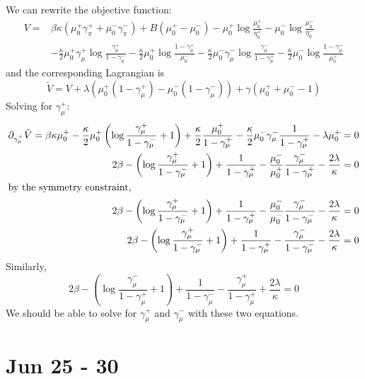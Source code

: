\documentclass[12pt]{article}
\numberwithin{equation}{section}
\begin{document}
\newpage
We can rewrite the objective function:
\begin{align*}
    V = & \beta \kappa\left(\mu_0^+\gamma_\pi^+ + \mu_0^-\gamma_\pi^-\right)
    + B\left(\mu_0^+ - \mu_0^-\right)
    - \mu_0^+\log\frac{\mu_0^+}{\eta_0^+} - \mu_0^-\log\frac{\mu_0^-}{\eta_0^-}      \\
        & - \frac\kappa2\mu_0^+\gamma_\mu^+\log\frac{\gamma_\mu^+}{1 - \gamma_\mu^-}
    - \frac\kappa2\mu_0^+\log\frac{1 - \gamma_\mu^+}{\mu_0^-}
    - \frac\kappa2\mu_0^-\gamma_\mu^-\log\frac{\gamma_\mu^-}{1 - \gamma_\mu^+}
    - \frac\kappa2\mu_0^-\log\frac{1 - \gamma_\mu^-}{\mu_0^+}
\end{align*}
and the corresponding Lagrangian is
\begin{equation*}
    \tilde{V} = V + \lambda(\mu_0^+(1-\gamma_\mu^+) - \mu_0^-(1-\gamma_\mu^-)) + \gamma (\mu_0^+ + \mu_0^- - 1)
\end{equation*}
Solving for $\gamma_\mu^+$:
\begin{align*}
    \partial_{\gamma_\mu^+} \tilde{V} = \beta\kappa\mu_0^+ -\frac\kappa2\mu_0^+\left(\log\frac{\gamma_\mu^+}{1-\gamma_\mu^-} + 1\right)
    + \frac\kappa2\frac{\mu_0^+}{1-\gamma_\mu^+} - \frac\kappa2\mu_0^-\gamma_\mu^-\frac{1}{1-\gamma_\mu^+}-\lambda\mu_0^+ & = 0 \\
    2\beta - \left(\log\frac{\gamma_\mu^+}{1-\gamma_\mu^-} + 1\right)
    + \frac{1}{1-\gamma_\mu^+} - \frac{\mu_0^-}{\mu_0^+}\frac{\gamma_\mu^-}{1-\gamma_\mu^+}-\frac{2\lambda}{\kappa}       & = 0 \\
    \intertext{by the symmetry constraint, }
    2\beta - \left(\log\frac{\gamma_\mu^+}{1-\gamma_\mu^-} + 1\right)
    + \frac{1}{1-\gamma_\mu^+} - \frac{\mu_0^-}{\mu_0^-}\frac{\gamma_\mu^-}{1-\gamma_\mu^-}-\frac{2\lambda}{\kappa}       & = 0 \\
    2\beta - \left(\log\frac{\gamma_\mu^+}{1-\gamma_\mu^-} + 1\right)
    + \frac{1}{1-\gamma_\mu^+} - \frac{\gamma_\mu^-}{1-\gamma_\mu^-}-\frac{2\lambda}{\kappa}                              & = 0
\end{align*}
Similarly,
\begin{equation*}
    2\beta - \left(\log\frac{\gamma_\mu^-}{1-\gamma_\mu^+} + 1\right)
    + \frac{1}{1-\gamma_\mu^-} - \frac{\gamma_\mu^+}{1-\gamma_\mu^+}+\frac{2\lambda}{\kappa}= 0
\end{equation*}
We should be able to solve for $\gamma_\mu^+$ and $\gamma_\mu^-$ with these two equations.

\newpage

\section{Jun 25 - 30}
\end{document}
